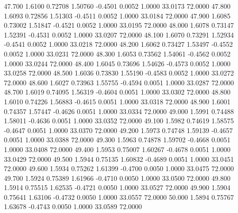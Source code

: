   47.700   1.6100   0.72708   1.50760  -0.4501   0.0052   1.0000  33.0173  72.0000
  47.800   1.6093   0.72856   1.51303  -0.4511   0.0052   1.0000  33.0184  72.0000
  47.900   1.6085   0.73002   1.51847  -0.4521   0.0052   1.0000  33.0195  72.0000
  48.000   1.6078   0.73147   1.52391  -0.4531   0.0052   1.0000  33.0207  72.0000
  48.100   1.6070   0.73291   1.52934  -0.4541   0.0052   1.0000  33.0218  72.0000
  48.200   1.6062   0.73427   1.53497  -0.4552   0.0052   1.0000  33.0231  72.0000
  48.300   1.6053   0.73562   1.54061  -0.4562   0.0052   1.0000  33.0244  72.0000
  48.400   1.6045   0.73696   1.54626  -0.4573   0.0052   1.0000  33.0258  72.0000
  48.500   1.6036   0.73830   1.55190  -0.4583   0.0052   1.0000  33.0272  72.0000
  48.600   1.6027   0.73963   1.55755  -0.4594   0.0051   1.0000  33.0287  72.0000
  48.700   1.6019   0.74095   1.56319  -0.4604   0.0051   1.0000  33.0302  72.0000
  48.800   1.6010   0.74226   1.56883  -0.4615   0.0051   1.0000  33.0318  72.0000
  48.900   1.6001   0.74357   1.57447  -0.4626   0.0051   1.0000  33.0334  72.0000
  49.000   1.5991   0.74488   1.58011  -0.4636   0.0051   1.0000  33.0352  72.0000
  49.100   1.5982   0.74619   1.58575  -0.4647   0.0051   1.0000  33.0370  72.0000
  49.200   1.5973   0.74748   1.59139  -0.4657   0.0051   1.0000  33.0388  72.0000
  49.300   1.5963   0.74878   1.59702  -0.4668   0.0051   1.0000  33.0408  72.0000
  49.400   1.5953   0.75007   1.60267  -0.4678   0.0051   1.0000  33.0429  72.0000
  49.500   1.5944   0.75135   1.60832  -0.4689   0.0051   1.0000  33.0451  72.0000
  49.600   1.5934   0.75262   1.61399  -0.4700   0.0050   1.0000  33.0475  72.0000
  49.700   1.5924   0.75389   1.61966  -0.4710   0.0050   1.0000  33.0500  72.0000
  49.800   1.5914   0.75515   1.62535  -0.4721   0.0050   1.0000  33.0527  72.0000
  49.900   1.5904   0.75641   1.63106  -0.4732   0.0050   1.0000  33.0557  72.0000
  50.000   1.5894   0.75767   1.63678  -0.4743   0.0050   1.0000  33.0589  72.0000
